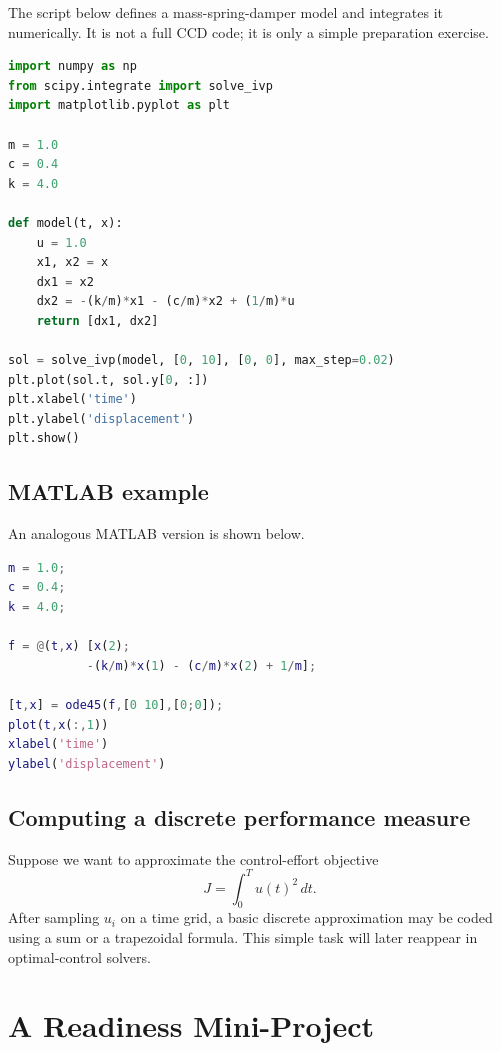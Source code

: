 \documentclass[11pt]{article}
\begin{document}
The script below defines a mass-spring-damper model and integrates it numerically. It is not a full CCD code; it is only a simple preparation exercise.

\begin{lstlisting}[language=Python,caption={Simple Python example for simulating a mass-spring-damper system.}]
import numpy as np
from scipy.integrate import solve_ivp
import matplotlib.pyplot as plt

m = 1.0
c = 0.4
k = 4.0

def model(t, x):
    u = 1.0
    x1, x2 = x
    dx1 = x2
    dx2 = -(k/m)*x1 - (c/m)*x2 + (1/m)*u
    return [dx1, dx2]

sol = solve_ivp(model, [0, 10], [0, 0], max_step=0.02)
plt.plot(sol.t, sol.y[0, :])
plt.xlabel('time')
plt.ylabel('displacement')
plt.show()
\end{lstlisting}

\subsection{MATLAB example}

An analogous MATLAB version is shown below.

\begin{lstlisting}[language=Matlab,caption={Simple MATLAB example for simulating a mass-spring-damper system.}]
m = 1.0;
c = 0.4;
k = 4.0;

f = @(t,x) [x(2);
           -(k/m)*x(1) - (c/m)*x(2) + 1/m];

[t,x] = ode45(f,[0 10],[0;0]);
plot(t,x(:,1))
xlabel('time')
ylabel('displacement')
\end{lstlisting}

\subsection{Computing a discrete performance measure}

Suppose we want to approximate the control-effort objective
\begin{equation}
J = \int_0^T u(t)^2\,dt.
\end{equation}
After sampling $u_i$ on a time grid, a basic discrete approximation may be coded using a sum or a trapezoidal formula. This simple task will later reappear in optimal-control solvers.

\section{A Readiness Mini-Project}
\end{document}
